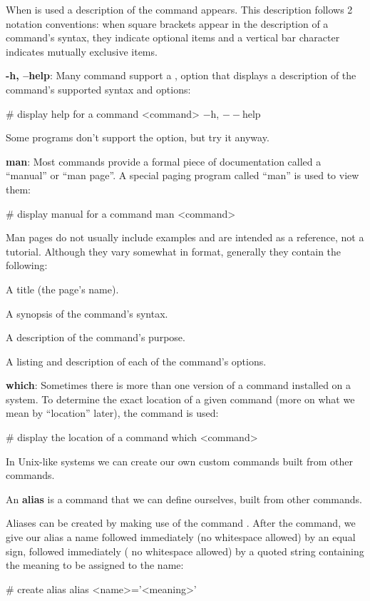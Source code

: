 When  is used a description of the command appears. This description follows 2 notation conventions: when
square brackets appear in the description of a command's syntax, they indicate optional items and a vertical bar
character indicates mutually exclusive items.

\item \textbf{-h, --help}: Many command support a ,  option that displays a description of the
command's supported syntax and options:
\begin{bash}
# display help for a command
<command> $-$h, $--$help
\end{bash}

Some programs don't support the option, but try it anyway.

\item \textbf{man}: Most commands provide a formal piece of documentation called a ``manual'' or ``man page''. A special
paging program called ``man'' is used to view them:
\begin{bash}
# display manual for a command
man <command>
\end{bash}

Man pages do not usually include examples and are intended as a reference, not a tutorial. Although they vary somewhat
in format, generally they contain the following:
\bit
\item A title (the page's name).
\item A synopsis of the command's syntax.
\item A description of the command's purpose.
\item A listing and description of each of the command's options.
\eit

\item \textbf{which}: Sometimes there is more than one version of a command installed on a system. To determine the
exact location of a given command (more on what we mean by ``location'' later), the  command is used:
\begin{bash}
# display the location of a command
which <command>
\end{bash}
\eit

In Unix-like systems we can create our own custom commands built from other commands.

\bd[Alias]
An \textbf{alias} is a command that we can define ourselves, built from other commands.
\ed

Aliases can be created by making use of the command . After the command, we give our alias a name followed immediately (no whitespace allowed) by an equal sign, followed immediately (
no whitespace allowed) by a quoted string containing the meaning to be assigned to the name:
\begin{bash}
# create alias
alias <name>='<meaning>'
\end{bash}

